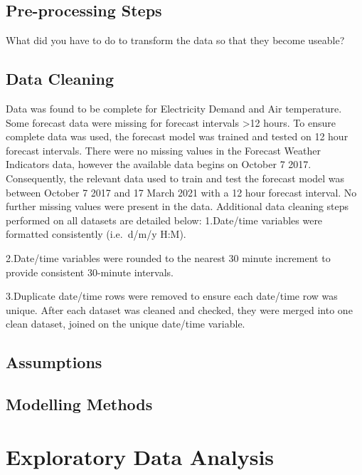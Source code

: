 \documentclass[mstat,12pt,a4paper]{unswthesis}
\begin{document}
\section{Pre-processing Steps}\label{pre-processing-steps}

What did you have to do to transform the data so that they become
useable?

\section{Data Cleaning}\label{data-cleaning}

Data was found to be complete for Electricity Demand and Air
temperature. Some forecast data were missing for forecast intervals
\textgreater12 hours. To ensure complete data was used, the forecast
model was trained and tested on 12 hour forecast intervals. There were
no missing values in the Forecast Weather Indicators data, however the
available data begins on October 7 2017.\\
\bigskip Consequently, the relevant data used to train and test the
forecast model was between October 7 2017 and 17 March 2021 with a 12
hour forecast interval. No further missing values were present in the
data. \bigskip Additional data cleaning steps performed on all datasets
are detailed below: \bigskip 1.Date/time variables were formatted
consistently (i.e.~d/m/y H:M).

2.Date/time variables were rounded to the nearest 30 minute increment to
provide consistent 30-minute intervals.

3.Duplicate date/time rows were removed to ensure each date/time row was
unique. \bigskip After each dataset was cleaned and checked, they were
merged into one clean dataset, joined on the unique date/time variable.

\section{Assumptions}\label{assumptions}

\section{Modelling Methods}\label{modelling-methods}

\chapter{Exploratory Data Analysis}\label{exploratory-data-analysis}
\end{document}

